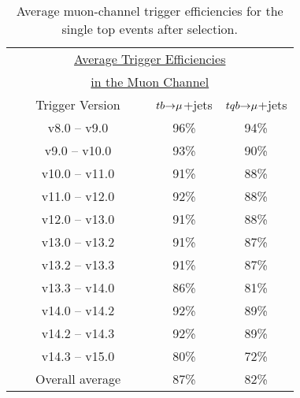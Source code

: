 \begin{table}[!h!tbp]
\begin{center}
\begin{minipage}{2.8in}
\begin{ruledtabular}
\begin{tabular}{c||cc} 
\multicolumn{3}{c}{\hspace{0.1in}\underline{Average Trigger Efficiencies}}\\
\multicolumn{3}{c}{\hspace{0.1in}\underline{in the Muon Channel}}\\
~~~ Trigger Version ~~~& $tb{\rightarrow}\mu$+jets & $tqb{\rightarrow}\mu$+jets \\
\hline
 v8.0 -- v9.0   &  96\%  &  94\%  \\            
 v9.0 -- v10.0  &  93\%  &  90\%  \\            
v10.0 -- v11.0  &  91\%  &  88\%  \\            
v11.0 -- v12.0  &  92\%  &  88\%  \\            
v12.0 -- v13.0  &  91\%  &  88\%  \\ 
v13.0 -- v13.2  &  91\%  &  87\%  \\            
v13.2 -- v13.3  &  91\%  &  87\%  \\         
v13.3 -- v14.0  &  86\%  &  81\%  \\ 
v14.0 -- v14.2  &  92\%  &  89\%  \\   
v14.2 -- v14.3  &  92\%  &  89\%  \\
v14.3 -- v15.0  &  80\%  &  72\%  \\
\hline		                
Overall average &  87\%  &  82\%
\end{tabular}
\end{ruledtabular}
\vspace{-0.1in}
\caption[mutriggerefficiencies]{Average muon-channel trigger
efficiencies for the single top events after selection.}
\label{mutrigger-efficiencies}
\end{minipage}
\end{center}
\end{table}

\vspace{2in}